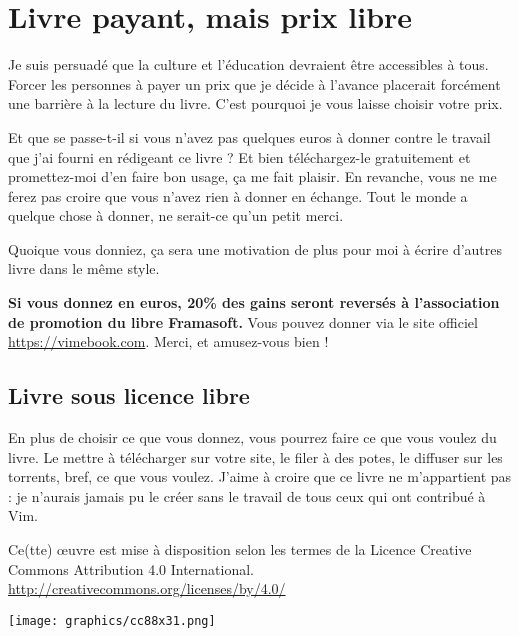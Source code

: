 
\chapter*{Livre payant, mais prix libre}

 Je suis persuadé que la culture et l'éducation devraient être accessibles à tous. Forcer les personnes à payer un prix que je décide à l'avance placerait forcément une barrière à la lecture du livre. C'est pourquoi je vous laisse choisir votre prix.

Et que se passe-t-il si vous n'avez pas quelques euros à donner contre le travail que j'ai fourni en rédigeant ce livre ? Et bien téléchargez-le gratuitement et promettez-moi d'en faire bon usage, ça me fait plaisir. En revanche, vous ne me ferez pas croire que vous n'avez rien à donner en échange. Tout le monde a quelque chose à donner, ne serait-ce qu'un petit merci.

Quoique vous donniez, ça sera une motivation de plus pour moi à écrire d'autres livre dans le même style.

\textbf{Si vous donnez en euros, 20\% des gains seront reversés à l'association de promotion du libre Framasoft.} Vous pouvez donner via le site officiel \url{https://vimebook.com}. Merci, et amusez-vous bien !

\section{Livre sous licence libre}

En plus de choisir ce que vous donnez, vous pourrez faire ce que vous voulez du livre. Le mettre à télécharger sur votre site, le filer à des potes, le diffuser sur les torrents, bref, ce que vous voulez. J'aime à croire que ce livre ne m'appartient pas : je n'aurais jamais pu le créer sans le travail de tous ceux qui ont contribué à Vim.

Ce(tte) œuvre est mise à disposition selon les termes de la Licence Creative Commons Attribution 4.0 International.
\url{http://creativecommons.org/licenses/by/4.0/}

\texttt{[image: graphics/cc88x31.png]}
